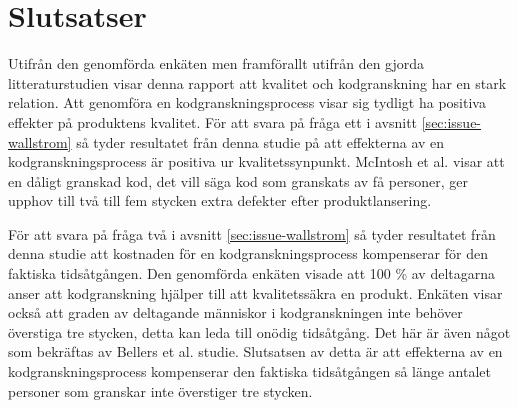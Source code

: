 \section{Slutsatser}
\label{sec:conclusions-wallstrom}
Utifrån den genomförda enkäten men framförallt utifrån den gjorda litteraturstudien visar denna rapport att kvalitet och kodgranskning har en stark relation. Att genomföra en kodgranskningsprocess visar sig tydligt ha positiva effekter på produktens kvalitet. För att svara på fråga ett i avsnitt \ref{sec:issue-wallstrom} så tyder resultatet från denna studie på att effekterna av en kodgranskningsprocess är positiva ur kvalitetssynpunkt. McIntosh et al. \cite{mcintosh2014impact} visar att en dåligt granskad kod, det vill säga kod som granskats av få personer, ger upphov till två till fem stycken extra defekter efter produktlansering.

För att svara på fråga två i avsnitt \ref{sec:issue-wallstrom} så tyder resultatet från denna studie att kostnaden för en kodgranskningsprocess kompenserar för den faktiska tidsåtgången. Den genomförda enkäten visade att 100 \% av deltagarna anser att kodgranskning hjälper till att kvalitetssäkra en produkt. Enkäten visar också att graden av deltagande människor i kodgranskningen inte behöver överstiga tre stycken, detta kan leda till onödig tidsåtgång. Det här är även något som bekräftas av Bellers et al. \cite{beller2014modern} studie. Slutsatsen av detta är att effekterna av en kodgranskningsprocess kompenserar den faktiska tidsåtgången så länge antalet personer som granskar inte överstiger tre stycken.


